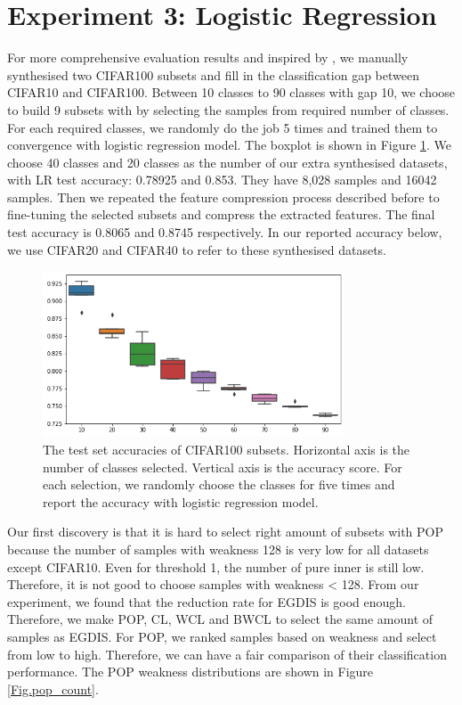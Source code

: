 \section{Experiment 3: Logistic Regression}
\label{lr}

For more comprehensive evaluation results and inspired by \cite{Istrate2019}, we manually synthesised two CIFAR100 subsets and fill in the classification gap between CIFAR10 and CIFAR100. Between 10 classes to 90 classes with gap 10, we choose to build 9 subsets with by selecting the samples from required number of classes. For each required classes, we randomly do the job 5 times and trained them to convergence with logistic regression model. The boxplot is shown in Figure \ref{Fig.logistic_subsets}. We choose 40 classes and 20 classes as the number of our extra synthesised datasets, with LR test accuracy: 0.78925 and 0.853. They have 8,028 samples and 16042 samples. Then we repeated the feature compression process described before to fine-tuning the selected subsets and compress the extracted features. The final test accuracy is 0.8065 and 0.8745 respectively. In our reported accuracy below, we use CIFAR20 and CIFAR40 to refer to these synthesised datasets.

 \begin{figure}[H]
 \centering
 \includegraphics[width=0.8\textwidth]{src/subsets.png}
 \caption{The test set accuracies of CIFAR100 subsets. Horizontal axis is the number of classes selected. Vertical axis is the accuracy score. For each selection, we randomly choose the classes for five times and report the accuracy with logistic regression model.}
 \label{Fig.logistic_subsets}
 \end{figure}
 
 Our first discovery is that it is hard to select right amount of subsets with POP because the number of samples with weakness 128 is very low for all datasets except CIFAR10. Even for threshold 1, the number of pure inner is still low. Therefore, it is not good to choose samples with weakness < 128. From our experiment, we found that the reduction rate for EGDIS is good enough. Therefore, we make POP, CL, WCL and BWCL to select the same amount of samples as EGDIS. For POP, we ranked samples based on weakness and select from low to high. Therefore, we can have a fair comparison of their classification performance. The POP weakness distributions are shown in Figure \ref{Fig.pop_count}.
 
